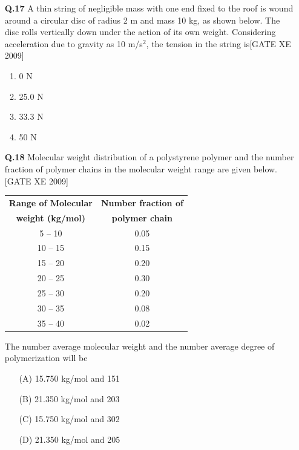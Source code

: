 \documentclass[journal,12pt,onecolumn]{IEEEtran}
\theoremstyle{remark}
\begin{document}
\begin{enumerate}
\vspace{0.3cm}

\item[\textbf{Q.17}] A thin string of negligible mass with one end fixed to the roof is wound around a circular disc of radius 2 m and mass 10 kg, as shown below. The disc rolls vertically down under the action of its own weight. Considering acceleration due to gravity as 10 m/s$^2$, the tension in the string is\hfill[GATE XE 2009]

\begin{multicols}{2}
\begin{enumerate}
    \item 0 N
    \item 25.0 N
    \item 33.3 N
    \item 50 N
\end{enumerate}
\end{multicols}

\item[\textbf{Q.18}]{Molecular weight distribution of a polystyrene polymer and the number fraction of polymer chains in the molecular weight range are given below.}\hfill[GATE XE 2009]

\begin{center}
\begin{tabular}{|c|c|}
\hline
\textbf{Range of Molecular} & \textbf{Number fraction of} \\
\textbf{weight (kg/mol)} & \textbf{polymer chain} \\
\hline
5 -- 10 & 0.05 \\
\hline
10 -- 15 & 0.15 \\
\hline
15 -- 20 & 0.20 \\
\hline
20 -- 25 & 0.30 \\
\hline
25 -- 30 & 0.20 \\
\hline
30 -- 35 & 0.08 \\
\hline
35 -- 40 & 0.02 \\
\hline
\end{tabular}
\end{center}

\vspace{1em}

The number average molecular weight and the number average degree of polymerization will be

\begin{itemize}
    \item[(A)] 15.750 kg/mol and 151
    \item[(B)] 21.350 kg/mol and 203
    \item[(C)] 15.750 kg/mol and 302
    \item[(D)] 21.350 kg/mol and 205
\end{itemize} 


\end{enumerate}
\end{document}
